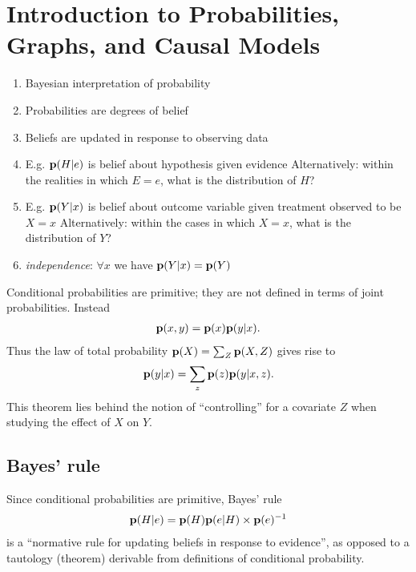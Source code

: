 \section{Introduction to Probabilities, Graphs, and Causal Models}

\begin{enumerate}
\item Bayesian interpretation of probability
\item Probabilities are degrees of belief
\item Beliefs are updated in response to observing data
\item E.g. $\mathbf{p}(H|e)$ is belief about hypothesis given evidence
  Alternatively: within the realities in which $E=e$, what is the distribution of $H$?
\item E.g. $\mathbf{p}(Y|x)$ is belief about outcome variable given treatment observed to be $X=x$
  Alternatively: within the cases in which $X=x$, what is the distribution of $Y$?
\item {\it independence}: $\forall x$ we have $\mathbf{p}(Y|x) = \mathbf{p}(Y)$
\end{enumerate}

Conditional probabilities are primitive; they are not defined in terms of joint probabilities. Instead
\begin{align*}
  \mathbf{p}(x, y) = \mathbf{p}(x)\mathbf{p}(y|x).
\end{align*}
Thus the law of total probability $\mathbf{p}(X) = \sum_Z\mathbf{p}(X, Z)$ gives rise to
\begin{align*}
  \mathbf{p}(y|x) = \sum_z \mathbf{p}(z)\mathbf{p}(y|x,z).
\end{align*}
This theorem lies behind the notion of ``controlling'' for a covariate $Z$ when studying the effect of $X$ on $Y$.

\subsection{Bayes' rule}

Since conditional probabilities are primitive, Bayes' rule
\begin{align*}
  \mathbf{p}(H|e) = \mathbf{p}(H) \mathbf{p}(e|H) \times \mathbf{p}(e)^{-1}
\end{align*}
is a ``normative rule for updating beliefs in response to evidence'', as opposed to a tautology (theorem) derivable from definitions of conditional probability.

